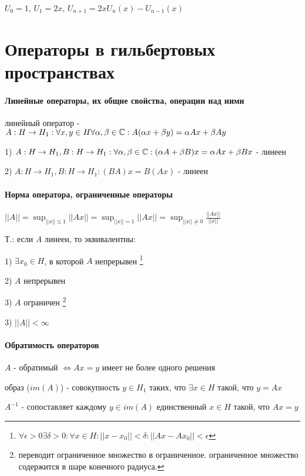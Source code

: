 \documentclass[russian,twocolumn]{article}
\begin{document}
$U_0 = 1$, $U_1 = 2x$, $U_{n+1}=2xU_n(x)-U_{n-1}(x)$

\section{Операторы в гильбертовых пространствах}

\paragraph{Линейные операторы, их общие свойства, операции над ними}

линейный оператор - $A:H\to H_1:\forall x,y\in H \forall \alpha,\beta \in \Bbb C:A(\alpha x + \beta y) = \alpha A x + \beta A y$

1) $A:H \to H_1, B : H \to H_1 : \forall \alpha, \beta \in \Bbb C : (\alpha A + \beta B)x = \alpha A x + \beta B x$ - линеен

2) $A:H \to H_1, B : H \to H_1 : (BA)x = B(Ax)$ - линеен

\paragraph{Норма оператора, ограниченные операторы}

$||A|| = \sup _{||x|| \le 1} ||Ax|| = \sup _{||x||=1} ||Ax|| = \sup _{||x|| \ne 0} \frac{||Ax||}{||x||}$

Т.: если $A$ линеен, то эквивалентны:

1) $\exists x_0 \in H$, в которой $A$ непрерывен \footnote{$\forall \epsilon > 0 \exists \delta > 0 : \forall x \in H : ||x - x_0|| < \delta : ||Ax - Ax_0|| < \epsilon$}

2) $A$ непрерывен

3) $A$ ограничен \footnote{переводит ограниченное множество в ограниченное. ограниченное множество содержится в шаре конечного радиуса.}

3) $||A|| < \infty$

\paragraph{Обратимость операторов}

$A$ - обратимый $\iff Ax=y$ имеет не более одного решения

образ ($im(A)$) - совокупность $y \in H_1$ таких, что $\exists x \in H$ такой, что $y = Ax$ 

$A^{-1}$ - сопоставляет каждому $y \in im(A)$ единственный $x \in H$ такой, что $Ax=y$
\end{document}
